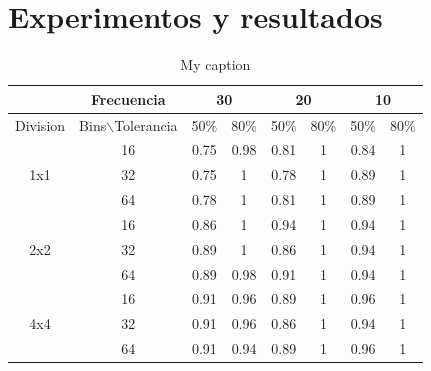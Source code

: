 \documentclass[14pt,letterpaper,hidelinks]{extarticle}
\begin{document}
\section{Experimentos y resultados}
\begin{table}[]
\centering
\caption{My caption}
\label{my-label}
\begin{tabular}{c|c|c|c|c|c|c|c|}
\cline{2-8}
 & Frecuencia & \multicolumn{2}{c|}{30} & \multicolumn{2}{c|}{20} & \multicolumn{2}{c|}{10} \\ \hline
\multicolumn{1}{|c|}{Division} & Bins$\backslash$Tolerancia & 50\% & 80\% & 50\% & 80\% & 50\% & 80\% \\ \hline
\multicolumn{1}{|c|}{\multirow{3}{*}{1x1}} & 16 & 0.75 & 0.98 & 0.81 & 1 & 0.84 & 1 \\ \cline{2-8} 
\multicolumn{1}{|c|}{} & 32 & 0.75 & 1 & 0.78 & 1 & 0.89 & 1 \\ \cline{2-8} 
\multicolumn{1}{|c|}{} & 64 & 0.78 & 1 & 0.81 & 1 & 0.89 & 1 \\ \hline
\multicolumn{1}{|c|}{\multirow{3}{*}{2x2}} & 16 & 0.86 & 1 & 0.94 & 1 & 0.94 & 1 \\ \cline{2-8} 
\multicolumn{1}{|c|}{} & 32 & 0.89 & 1 & 0.86 & 1 & 0.94 & 1 \\ \cline{2-8} 
\multicolumn{1}{|c|}{} & 64 & 0.89 & 0.98 & 0.91 & 1 & 0.94 & 1 \\ \hline
\multicolumn{1}{|c|}{\multirow{3}{*}{4x4}} & 16 & 0.91 & 0.96 & 0.89 & 1 & 0.96 & 1 \\ \cline{2-8} 
\multicolumn{1}{|c|}{} & 32 & 0.91 & 0.96 & 0.86 & 1 & 0.94 & 1 \\ \cline{2-8} 
\multicolumn{1}{|c|}{} & 64 & 0.91 & 0.94 & 0.89 & 1 & 0.96 & 1 \\ \hline
\end{tabular}
\end{table}
\end{document}
